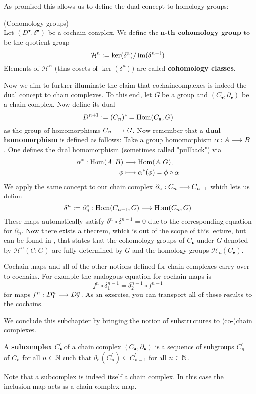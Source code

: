As promised this allows us to define the dual concept to homology groups:

\begin{definition}
\label{def:Cohomology}
(Cohomology groups)\\
Let $(D^\bullet, \delta^\bullet)$ be a cochain complex. We define the \textbf{n-th cohomology group} to be the quotient group
$$ \mathcal{H}^n := \ker(\delta^n) / \operatorname{im}(\delta^{n-1}) $$
Elements of $\mathcal{H}^n$ (thus cosets of $\ker(\delta^n)$) are called \textbf{cohomology classes}.
\end{definition}

Now we aim to further illuminate the claim that cochaincomplexes is indeed the dual concept to chain complexes. To this end, let $G$ be a group and $(C_\bullet, \partial_\bullet)$ be a chain complex. Now define its dual
$$ D^{n+1} := (C_n)^* = \operatorname{Hom}(C_n, G) $$
as the group of homomorphisms $C_n \longrightarrow G$. Now remember that a \textbf{dual homomorphism} is defined as follows: Take a group homomorphism $\alpha: A \longrightarrow B$. One defines the dual homomorphism (sometimes called "pullback") via
\begin{align}
  \alpha^*: \Hom(A,B) &\lra \Hom(A,G),\\
  \phi &\lmap \alpha^*(\phi) = \phi \circ \alpha
\end{align}
We apply the same concept to our chain complex $\partial_n:C_n \longrightarrow C_{n-1}$ which lets us define
$$\delta^n := \partial_n^* : \operatorname{Hom}(C_{n-1}, G) \longrightarrow \operatorname{Hom}(C_n, G)$$
These maps automatically satisfy $\delta^n \circ \delta^{n-1} = 0$ due to the corresponding equation for $\partial_n$. Now there exists a theorem, which is out of the scope of this lecture, but can be found in , that states that the cohomology groups of $C_\bullet$ under $G$ denoted by $\mathcal{H}^n(C;G)$ are fully determined by $G$ and the homology groups $\mathcal{H}_n(C_\bullet)$.

\begin{rem}
  Cochain maps and all of the other notions defined for chain complexes carry over to cochains. For example the analogous equation for cochain maps is
  $$ f^n \circ \delta_1^{n-1} = \delta_2^{n-1} \circ f^{n-1} $$
  for maps $f^n: D_1^n \longrightarrow D^n_2$. As an exercise, you can transport all of these results to the cochains.
\end{rem}

We conclude this subchapter by bringing the notion of substructures to (co-)chain complexes.

\begin{definition}
  A \textbf{subcomplex} $C_\bullet^\prime$ of a chain complex $(C_\bullet, \partial_\bullet)$ is a sequence of subgroups $C_n^\prime$ of $C_n$ for all $n\in \mathbb{N}$ such that $\partial_n(C^\prime_n) \subseteq C_{n-1}^\prime$ for all $n\in \mathbb{N}$.
\end{definition}

\begin{rem}
  Note that a subcomplex is indeed itself a chain complex. In this case the inclusion map acts as a chain complex map.
\end{rem}



\newpage
